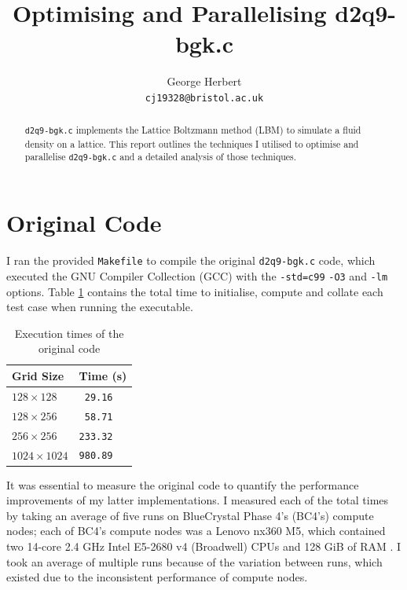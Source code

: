 \documentclass[twocolumn, a4paper]{article}
\author{
    George Herbert\\
    \texttt{cj19328@bristol.ac.uk}
}
\title{Optimising and Parallelising d2q9-bgk.c}
\begin{document}
\maketitle

\begin{abstract}
    \texttt{d2q9-bgk.c} implements the Lattice Boltzmann method (LBM) to simulate a fluid density on a lattice.
    This report outlines the techniques I utilised to optimise and parallelise \texttt{d2q9-bgk.c} and a detailed analysis of those techniques.
\end{abstract}

\section{Original Code}

I ran the provided \texttt{Makefile} to compile the original \texttt{d2q9-bgk.c} code, which executed the GNU Compiler Collection (GCC) with the \texttt{-std=c99} \texttt{-O3} and \texttt{-lm} options.
Table \ref{tab:original} contains the total time to initialise, compute and collate each test case when running the executable.

\begin{table}[htbp]
    \begin{center}
    \caption{Execution times of the original code}\label{tab:original}
    \begin{tabular}{l | l} 
        \hline\hline
        Grid Size&Time (s)\\
        \hline
        $128 \times 128$&\texttt{ 29.16}\\
        $128 \times 256$&\texttt{ 58.71}\\
        $256 \times 256$&\texttt{233.32}\\
        $1024 \times 1024$&\texttt{980.89}\\
        \hline
      \end{tabular}
    \end{center}
\end{table} 

It was essential to measure the original code to quantify the performance improvements of my latter implementations.
I measured each of the total times by taking an average of five runs on BlueCrystal Phase 4's (BC4's) compute nodes; each of BC4's compute nodes was a Lenovo nx360 M5, which contained two 14-core 2.4 GHz Intel E5-2680 v4 (Broadwell) CPUs and 128 GiB of RAM \cite{bcp4}.
I took an average of multiple runs because of the variation between runs, which existed due to the inconsistent performance of compute nodes.
\end{document}
